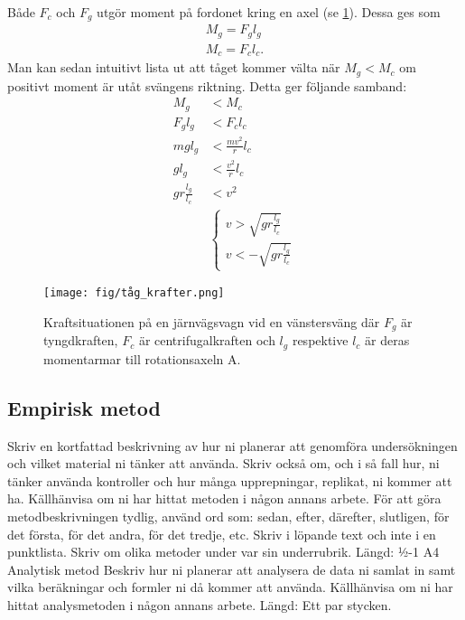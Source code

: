 Både $F_c$ och $F_g$ utgör moment på fordonet kring en axel (se \cref{fig:tåg_krafter_sväng}). Dessa ges som
\begin{gather}
    M_g = F_g l_g \\
    M_c = F_c l_c.
\end{gather}
Man kan sedan intuitivt lista ut att tåget kommer välta när $M_g < M_c$  om positivt moment är utåt svängens riktning. Detta ger följande samband:
\begin{align*}
    M_g &< M_c \\
    F_g l_g &< F_c l_c \\
    mg l_g &< \frac{mv^2}{r} l_c \\
    g l_g &< \frac{v^2}{r} l_c \\
    g r \frac{l_g}{l_c} &< v^2 \\
    &\left\{
        \begin{array}{l}
            v > \sqrt{g r \frac{l_g}{l_c}} \\
            v < -\sqrt{g r \frac{l_g}{l_c}}
        \end{array}
    \right.
\end{align*}

\begin{figure}[h!]
    \centering
    \texttt{[image: fig/tåg\_krafter.png]}
    \caption{Kraftsituationen på en järnvägsvagn vid en vänstersväng där $F_g$ är tyngdkraften, $F_c$ är centrifugalkraften och $l_g$ respektive $l_c$ är deras momentarmar till rotationsaxeln A.}
    \label{fig:tåg_krafter_sväng}
\end{figure}

\subsection{Empirisk metod}
Skriv en kortfattad beskrivning av hur ni planerar att genomföra undersökningen och vilket material ni tänker att använda. Skriv också om, och i så fall hur, ni tänker använda kontroller och hur många upprepningar, replikat, ni kommer att ha. Källhänvisa om ni har hittat metoden i någon annans arbete. För att göra metodbeskrivningen tydlig, använd ord som: sedan, efter, därefter, slutligen, för det första, för det andra, för det tredje, etc. Skriv i löpande text och inte i en punktlista. Skriv om olika metoder under var sin underrubrik.
Längd: ½-1 A4
Analytisk metod
Beskriv hur ni planerar att analysera de data ni samlat in samt vilka beräkningar och formler ni då kommer att använda. Källhänvisa om ni har hittat analysmetoden i någon annans arbete.
Längd: Ett par stycken.


